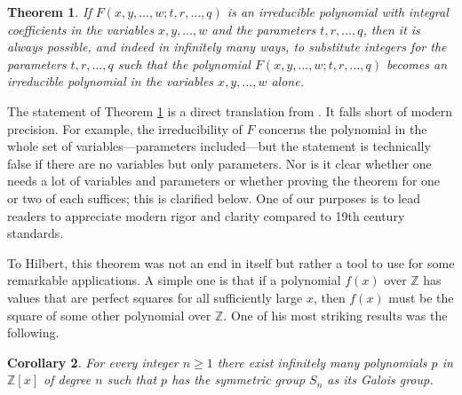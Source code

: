 \documentclass{article}
\theoremstyle{plain}
\newtheorem{thm}{Theorem}
\newtheorem{cor}[thm]{Corollary}
\theoremstyle{definition}
\renewcommand{\geq}{\geqslant}  %
\newcommand{\Zed}{\mathbb{Z}}   %
\begin{document}
\begin{thm} %
\label{irreducibility}
If $F(x,y,\dots,w;t,r,\dots,q)$ is an irreducible polynomial with 
integral coefficients
% 
% 
in the variables $x,y,\dots,w$ and the parameters $t,r,\dots,q$, then
it is always possible, and indeed in infinitely many ways, to
substitute integers for the parameters $t,r,\dots,q$ such that the
polynomial $F(x,y,\dots,w;t,r,\dots,q)$ becomes an irreducible
polynomial in the variables $x,y,\dots,w$ alone.
\end{thm}

The statement of Theorem \ref{irreducibility} is a direct translation from \cite{Hilbert1892}.  It falls short of modern precision.    
For example, the irreducibility of $F$ concerns the polynomial in the whole set of variables---parameters included---but the statement is technically false if there are no variables but only parameters. Nor is it clear whether one needs a lot of variables and parameters or whether proving the theorem for one or two of each suffices; this is clarified below.
%
One of our purposes is to lead readers to appreciate modern rigor and clarity compared to 19th century standards.  



To Hilbert, this theorem was not an end in itself but rather a tool to
use for some remarkable applications. A simple one is that if a
polynomial $f(x)$ over $\Zed$ has values that are perfect squares for
all sufficiently large $x$, then $f(x)$ must be the square of some
other polynomial over $\Zed$. One of his most striking results was the following.




\begin{cor} %
For every integer $n\geq 1$ there exist infinitely many polynomials $p$  in
$\Zed[x]$ of degree $n$ such that $p$ has the symmetric group $S_n$ as its Galois
group.
\end{cor}
\end{document}
